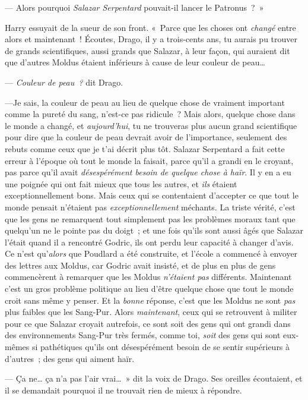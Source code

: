 --- Alors pourquoi \emph{Salazar Serpentard} pouvait-il lancer le Patronus~?~»

Harry essuyait de la sueur de son front.
«~Parce que les choses ont \emph{changé} entre alors et maintenant~! Écoutes, Drago, il y a trois-cents ans, tu aurais pu trouver de grands scientifiques, aussi grands que Salazar, à leur façon, qui auraient dit que d'autres Moldus étaient inférieurs à cause de leur couleur de peau…

--- \emph{Couleur de peau~?} dit Drago.

---Je sais, la couleur de peau au lieu de quelque chose de vraiment important comme la pureté du sang, n'est-ce pas ridicule~? Mais alors, quelque chose dans le monde a changé, et \emph{aujourd'hui}, tu ne trouveras plus aucun grand scientifique pour dire que la couleur de peau devrait avoir de l'importance, seulement des rebuts comme ceux que je t'ai décrit plus tôt. Salazar Serpentard a fait cette erreur à l'époque où tout le monde la faisait, parce qu'il a grandi en le croyant, pas parce qu'il avait \emph{désespérément besoin de quelque chose à haïr}. Il y en a eu une poignée qui ont fait mieux que tous les autres, et \emph{ils} étaient exceptionnellement bons. Mais ceux qui se contentaient d'accepter ce que tout le monde pensait n'étaient pas \emph{exceptionnellement} méchants. La triste vérité, c'est que les gens ne remarquent tout simplement pas les problèmes moraux tant que quelqu'un ne le pointe pas du doigt~; et une fois qu'ils sont aussi âgés que Salazar l'était quand il a rencontré Godric, ils ont perdu leur capacité à changer d'avis. Ce n'est qu'\emph{alors} que Poudlard a été construite, et l'école a commencé à envoyer des lettres aux Moldus, car Godric avait insisté, et de plus en plus de gens commencèrent à remarquer que les Moldus \emph{n'étaient pas} différents. Maintenant c'est un gros problème politique au lieu d'être quelque chose que tout le monde croit sans même y penser. Et la \emph{bonne} réponse, c'est que les Moldus ne sont \emph{pas} plus faibles que les Sang-Pur. Alors \emph{maintenant}, ceux qui se retrouvent à militer pour ce que Salazar croyait autrefois, ce sont soit des gens qui ont grandi dans des environnements Sang-Pur très fermés, comme toi, \emph{soit} des gens qui sont eux-mêmes si pathétiques qu'ils ont désespérément besoin de se sentir supérieurs à d'autres~; des gens qui aiment haïr.

--- Ça ne… ça n'a pas l'air vrai…~» dit la voix de Drago. Ses oreilles écoutaient, et il se demandait pourquoi il ne trouvait rien de mieux à répondre.

